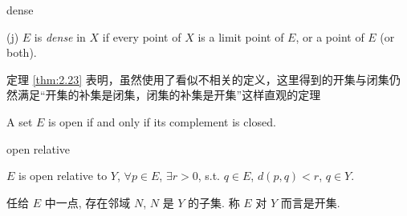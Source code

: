 \begin{definition} dense

    (j) $E$ is \emph{dense} in $X$ if every point of $X$ is a limit point of $E$, or a point of $E$ (or both).
\end{definition}

定理 \ref{thm:2.23} 表明，虽然使用了看似不相关的定义，这里得到的开集与闭集仍然满足``开集的补集是闭集，闭集的补集是开集''这样直观的定理
\begin{mynewthm}
    A set $E$ is open if and only if its complement is closed.
\end{mynewthm}

\begin{definition} open relative

    $E$ is open relative to $Y$, $\forall p \in E$, $\exists r>0$, s.t. $q \in E$, $d(p, q)<r$, $q \in Y$.
\end{definition}
任给 $E$ 中一点, 存在邻域 $N$, $N$ 是 $Y$ 的子集. 称 $E$ 对 $Y$ 而言是开集.